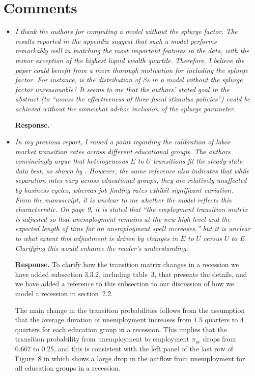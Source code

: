 \documentclass[12pt,letterpaper,english]{article}
\begin{document}
\section{Comments}
\begin{itemize}
	
	\item \textit{I thank the authors for computing a model without the splurge factor. The results reported in the appendix suggest that such a model performs remarkably well in matching the most important features in the data, with the minor exception of the highest liquid wealth quartile. Therefore, I believe the paper could benefit from a more thorough motivation for including the splurge factor. For instance, is the distribution of $\beta$s in a model without the splurge factor unreasonable? It seems to me that the authors’ stated goal in the abstract (to ``assess the effectiveness of three fiscal stimulus policies'') could be achieved without the somewhat ad-hoc inclusion of the splurge parameter.}
	
	\noindent \textbf{Response.} 
	
	\item \textit{In my previous report, I raised a point regarding the calibration of labor market transition rates across different educational groups. The authors convincingly argue that heterogeneous $E$ to $U$ transitions fit the steady-state data best, as shown by \citet{elsby2010labor}. However, the same reference also indicates that while separation rates vary across educational groups, they are relatively unaffected by business cycles, whereas job-finding rates exhibit significant variation. From the manuscript, it is unclear to me whether the model reflects this characteristic. On page 9, it is stated that ``the employment transition matrix is adjusted so that unemployment remains at the new high level and the expected length of time for an unemployment spell increases,'' but it is unclear to what extent this adjustment	is driven by changes in $E$ to $U$ versus $U$ to $E$. Clarifying this would enhance the reader’s understanding.}	
	
	\noindent \textbf{Response.} To clarify how the transition matrix changes in a recession we have added subsection 3.3.2, including table~3, that presents the details, and we have added a reference to this subsection to our discussion of how we model a recession in section~2.2. 
	
	The main change in the transition probabilities follows from the assumption that the average duration of unemployment increases from $1.5$ quarters to $4$ quarters for each education group in a recession. This implies that the transition probability from unemployment to employment $\pi_{ue}$ drops from $0.667$ to $0.25$, and this is consistent with the left panel of the last row of Figure~8 in \citet{elsby2010labor} which shows a large drop in the outflow from unemployment for all education groups in a recession. 
	

\end{itemize}
\end{document}
